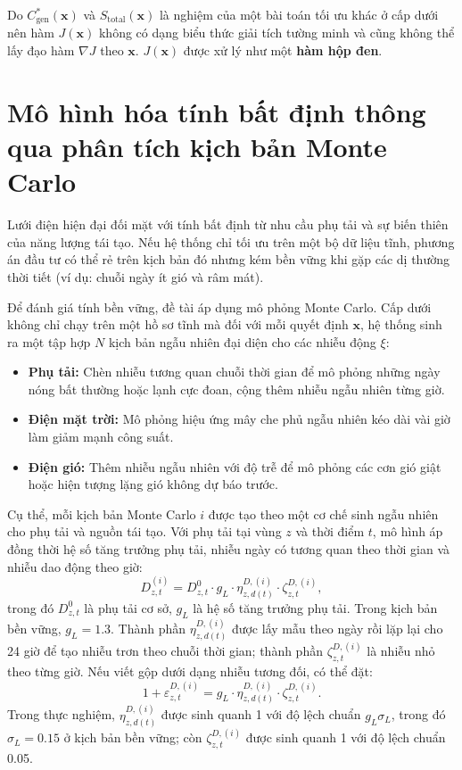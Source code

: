 Do $C_{\text{gen}}^*(\mathbf{x})$ và $S_{\text{total}}(\mathbf{x})$ là nghiệm của một bài toán tối ưu khác ở cấp dưới nên hàm $J(\mathbf{x})$ không có dạng biểu thức giải tích tường minh và cũng không thể lấy đạo hàm $\nabla J$ theo $\mathbf{x}$. $J(\mathbf{x})$ được xử lý như một \textbf{hàm hộp đen}.

\section{Mô hình hóa tính bất định thông qua phân tích kịch bản Monte Carlo}

Lưới điện hiện đại đối mặt với tính bất định từ nhu cầu phụ tải và sự biến thiên của năng lượng tái tạo. Nếu hệ thống chỉ tối ưu trên một bộ dữ liệu tĩnh, phương án đầu tư có thể rẻ trên kịch bản đó nhưng kém bền vững khi gặp các dị thường thời tiết (ví dụ: chuỗi ngày ít gió và râm mát).

Để đánh giá tính bền vững, đề tài áp dụng mô phỏng Monte Carlo. Cấp dưới không chỉ chạy trên một hồ sơ tĩnh mà đối với mỗi quyết định $\mathbf{x}$, hệ thống sinh ra một tập hợp $N$ kịch bản ngẫu nhiên đại diện cho các nhiễu động $\xi$:
\begin{itemize}
    \item \textbf{Phụ tải:} Chèn nhiễu tương quan chuỗi thời gian để mô phỏng những ngày nóng bất thường hoặc lạnh cực đoan, cộng thêm nhiễu ngẫu nhiên từng giờ.
    \item \textbf{Điện mặt trời:} Mô phỏng hiệu ứng mây che phủ ngẫu nhiên kéo dài vài giờ làm giảm mạnh công suất.
    \item \textbf{Điện gió:} Thêm nhiễu ngẫu nhiên với độ trễ để mô phỏng các cơn gió giật hoặc hiện tượng lặng gió không dự báo trước.
\end{itemize}

Cụ thể, mỗi kịch bản Monte Carlo $i$ được tạo theo một cơ chế sinh ngẫu nhiên cho phụ tải và nguồn tái tạo. Với phụ tải tại vùng $z$ và thời điểm $t$, mô hình áp đồng thời hệ số tăng trưởng phụ tải, nhiễu ngày có tương quan theo thời gian và nhiễu dao động theo giờ:
\begin{equation}
    D_{z,t}^{(i)}
    =
    D_{z,t}^{0}
    \cdot g_L
    \cdot \eta_{z,d(t)}^{D,(i)}
    \cdot \zeta_{z,t}^{D,(i)},
    \label{eq:mc_load_perturbation}
\end{equation}
trong đó $D_{z,t}^{0}$ là phụ tải cơ sở, $g_L$ là hệ số tăng trưởng phụ tải. Trong kịch bản bền vững, $g_L = 1.3$. Thành phần $\eta_{z,d(t)}^{D,(i)}$ được lấy mẫu theo ngày rồi lặp lại cho 24 giờ để tạo nhiễu trơn theo chuỗi thời gian; thành phần $\zeta_{z,t}^{D,(i)}$ là nhiễu nhỏ theo từng giờ. Nếu viết gộp dưới dạng nhiễu tương đối, có thể đặt:
\begin{equation}
    1 + \varepsilon_{z,t}^{D,(i)}
    =
    g_L
    \cdot \eta_{z,d(t)}^{D,(i)}
    \cdot \zeta_{z,t}^{D,(i)}.
\end{equation}
Trong thực nghiệm, $\eta_{z,d(t)}^{D,(i)}$ được sinh quanh 1 với độ lệch chuẩn $g_L\sigma_L$, trong đó $\sigma_L=0.15$ ở kịch bản bền vững; còn $\zeta_{z,t}^{D,(i)}$ được sinh quanh 1 với độ lệch chuẩn 0.05.

